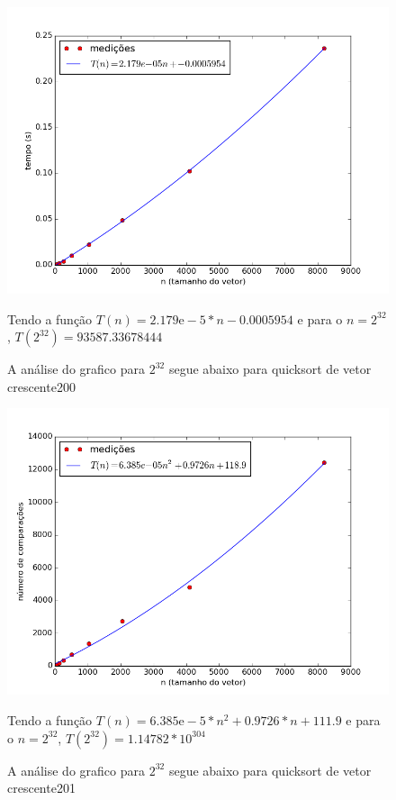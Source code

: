 \documentclass[12pt,a4paper,twoside]{report}
\begin{document}


\begin{figure}[ht]
\centering \includegraphics[scale=0.8]{../quicksort/imagens/quicksortQuaseCresc200.png}
\caption{A análise do grafico para $2^{32}$ segue abaixo para quicksort de vetor crescente200}
Tendo a função $T(n) = 2.179\mathrm{e}-5*n-0.0005954$ e para o $n =2^{32}$, $T(2^{32}) = 93587.33678444$ 

\label{fig:quicksortQuaseCresc200}
\end{figure}

\begin{figure}[ht]
\centering \includegraphics[scale=0.8]{../quicksort/imagens/quicksortQuaseCresc201.png}
\caption{A análise do grafico para $2^{32}$ segue abaixo para quicksort de vetor crescente201}
Tendo a função $T(n) = 6.385\mathrm{e}-5*n^2+0.9726*n+111.9$ e para o $n =2^{32}$, $T(2^{32}) = 1.14782*10^{304}$ 
\label{fig:quicksortQuaseCresc201}
\end{figure}
\end{document}
